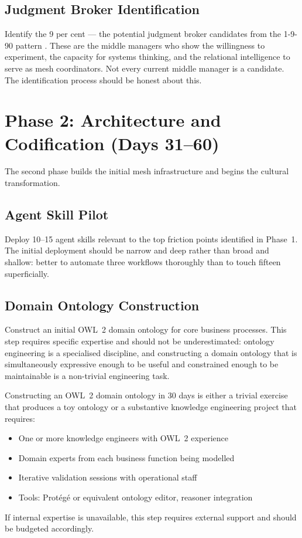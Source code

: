 \subsection{Judgment Broker Identification}

Identify the 9 per cent --- the potential judgment broker candidates from the 1-9-90 pattern \parencite{BCGAgenticShift2025}. These are the middle managers who show the willingness to experiment, the capacity for systems thinking, and the relational intelligence to serve as mesh coordinators. Not every current middle manager is a candidate. The identification process should be honest about this.

\section{Phase 2: Architecture and Codification (Days 31--60)}

The second phase builds the initial mesh infrastructure and begins the cultural transformation.

\subsection{Agent Skill Pilot}

Deploy 10--15 agent skills relevant to the top friction points identified in Phase~1. The initial deployment should be narrow and deep rather than broad and shallow: better to automate three workflows thoroughly than to touch fifteen superficially.

\subsection{Domain Ontology Construction}

Construct an initial OWL~2 domain ontology for core business processes. This step requires specific expertise and should not be underestimated: ontology engineering is a specialised discipline, and constructing a domain ontology that is simultaneously expressive enough to be useful and constrained enough to be maintainable is a non-trivial engineering task.

\begin{cautionbox}[title={Staffing and Expertise Requirements}]
Constructing an OWL~2 domain ontology in 30 days is either a trivial exercise that produces a toy ontology or a substantive knowledge engineering project that requires:
\begin{itemize}
  \item One or more knowledge engineers with OWL~2 experience
  \item Domain experts from each business function being modelled
  \item Iterative validation sessions with operational staff
  \item Tools: Prot\'eg\'e or equivalent ontology editor, reasoner integration
\end{itemize}
If internal expertise is unavailable, this step requires external support and should be budgeted accordingly.
\end{cautionbox}

